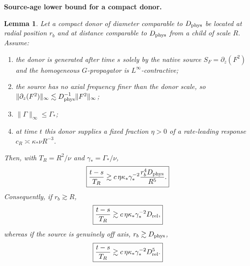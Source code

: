 \documentclass[11pt]{article}
\newtheorem{lemma}[theorem]{Lemma}
\theoremstyle{definition}\newtheorem{definition}[theorem]{Definition}
\theoremstyle{remark}\newtheorem{remark}[theorem]{Remark}
\begin{document}
\medskip
\noindent\textbf{Source-age lower bound for a compact donor.}
\begin{lemma}\label{lem:source-age}
Let a compact donor of diameter comparable to $D_{\rm phys}$ be located at
radial position $r_b$ and at distance comparable to $D_{\rm phys}$ from a
child of scale $R$.  Assume:
\begin{enumerate}[label=\textup{(\roman*)},leftmargin=2.2em]
\item the donor is generated after time $s$ solely by the native source
$S_F=\partial_z(F^2)$ and the homogeneous $G$-propagator is $L^\infty$-contractive;
\item the source has no axial frequency finer than the donor scale, so
$\|\partial_z(F^2)\|_\infty\lesssim
D_{\rm phys}^{-1}\|F^2\|_\infty$;
\item $\|\Gamma\|_\infty\le\Gamma_*$;
\item at time $t$ this donor supplies a fixed fraction $\eta>0$ of a
rate-leading response $c_R\asymp\kappa_*\nu R^{-3}$.
\end{enumerate}
Then, with $T_R=R^2/\nu$ and $\gamma_*=\Gamma_*/\nu$,
\[
\boxed{
 \frac{t-s}{T_R}
 \gtrsim
 c\,\eta\kappa_*\gamma_*^{-2}
 \frac{r_b^4D_{\rm phys}}{R^5}.}
\]
Consequently, if $r_b\gtrsim R$,
\[
\boxed{
 \frac{t-s}{T_R}
 \gtrsim
 c\,\eta\kappa_*\gamma_*^{-2}D_{\rm rel},}
\]
whereas if the source is genuinely off axis, $r_b\gtrsim D_{\rm phys}$,
\[
\boxed{
 \frac{t-s}{T_R}
 \gtrsim
 c\,\eta\kappa_*\gamma_*^{-2}D_{\rm rel}^{5}.}
\]
\end{lemma}
\end{document}

